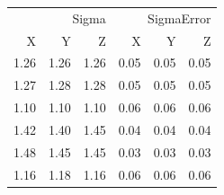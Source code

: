 \begin{tabular}{rrrrrr}
\toprule
\multicolumn{3}{r}{Sigma} & \multicolumn{3}{r}{SigmaError} \\
X & Y & Z & X & Y & Z \\
\midrule
1.26 & 1.26 & 1.26 & 0.05 & 0.05 & 0.05 \\
1.27 & 1.28 & 1.28 & 0.05 & 0.05 & 0.05 \\
1.10 & 1.10 & 1.10 & 0.06 & 0.06 & 0.06 \\
1.42 & 1.40 & 1.45 & 0.04 & 0.04 & 0.04 \\
1.48 & 1.45 & 1.45 & 0.03 & 0.03 & 0.03 \\
1.16 & 1.18 & 1.16 & 0.06 & 0.06 & 0.06 \\
\bottomrule
\end{tabular}
